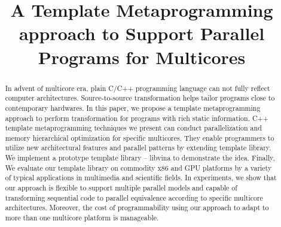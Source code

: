 \documentclass[conference]{IEEEtran}
\begin{document}
\title{A Template Metaprogramming approach to Support Parallel
  Programs for Multicores}


\author{
}

\maketitle


\begin{abstract}
In advent of multicore era, plain C/C++ programming language can not
fully reflect computer architectures. Source-to-source
transformation helps tailor programs close to contemporary
hardwares. In this paper, we propose a template metaprogramming approach to perform 
transformation for programs with rich static information.
C++ template metaprogramming techniques we present can conduct
parallelization and memory hierarchical optimization for specific multicores. They enable
programmers to utilize new architectural
features and parallel patterns by extending template library. 
We implement a prototype template library -- libvina
to demonstrate the idea. Finally, We evaluate our template library on
commodity x86 and GPU platforms by a variety of typical applications
in multimedia and scientific fields. In experiments, we show that our
approach is flexible to support multiple parallel models and capable
of transforming sequential code to parallel equivalence  according to
specific multicore architectures. Moreover, the cost of programmability using our
approach to adapt to more than one multicore platform is manageable.
\end{abstract}

\IEEEpeerreviewmaketitle



%




%






\end{document}
